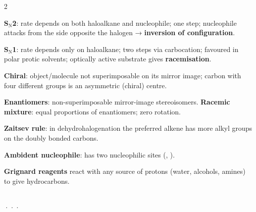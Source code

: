 \documentclass[10pt,a4paper]{extarticle}
\begin{document}
\begin{multicols}{2}
\begin{fl}
\item \textbf{S$_\text{N}$2}: rate depends on both haloalkane and nucleophile; one step; nucleophile attacks from the side opposite the halogen → \textbf{inversion of configuration}.
\item \textbf{S$_\text{N}$1}: rate depends only on haloalkane; two steps via carbocation; favoured in polar protic solvents; optically active substrate gives \textbf{racemisation}.
\item \textbf{Chiral}: object/molecule not superimposable on its mirror image; carbon with four different groups is an asymmetric (chiral) centre.
\item \textbf{Enantiomers}: non-superimposable mirror-image stereoisomers. \textbf{Racemic mixture}: equal proportions of enantiomers; zero rotation.
\item \textbf{Zaitsev rule}: in dehydrohalogenation the preferred alkene has more alkyl groups on the doubly bonded carbons.
\item \textbf{Ambident nucleophile}: has two nucleophilic sites (, ).
\item \textbf{Grignard reagents} react with any source of protons (water, alcohols, amines) to give hydrocarbons.
\end{fl}

\begin{kbox}
\quad {}\quad {}\\[1pt]
\;·\;\;·\;\;·\;\\[1pt]
\quad {}\quad {}\\[1pt]
\quad {}
\end{kbox}


\end{multicols}
\end{document}
